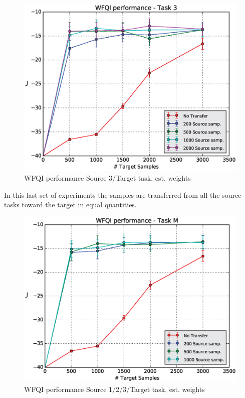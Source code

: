     \begin{figure}[H]
      \centering
      \includegraphics[scale=0.5]{images/WFQIPerf3.eps}
      \caption{WFQI performance Source 3/Target task, est. weights}
      \label{perf3E}
    \end{figure}

    \noindent In this last set of experiments the samples are transferred from all
    the source tasks toward the target in equal quantities.

    \begin{figure}[H]
      \centering
      \includegraphics[scale=0.5]{images/WFQIPerfM.eps}
      \caption{WFQI performance Source 1/2/3/Target task, est. weights}
      \label{perfME}
    \end{figure}

